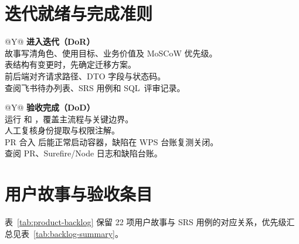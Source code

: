 \section{迭代就绪与完成准则}

\begin{table}[H]
\centering
\caption{迭代就绪与完成检查项}\label{tab:dor-dod}
\begin{minipage}[t]{.48\linewidth}
\reporttablesize
\begin{tabularx}{\linewidth}{@{}Y@{}}
\toprule
\textbf{进入迭代（DoR）} \\
\midrule
故事写清角色、使用目标、业务价值及 MoSCoW 优先级。 \\
表结构有变更时，先确定迁移方案。 \\
前后端对齐请求路径、DTO 字段与状态码。 \\
\midrule
查阅飞书待办列表、SRS 用例和 \mbox{SQL 评审记录。} \\
\bottomrule
\end{tabularx}
\end{minipage}\hfill
\begin{minipage}[t]{.48\linewidth}
\reporttablesize
\begin{tabularx}{\linewidth}{@{}Y@{}}
\toprule
\textbf{验收完成（DoD）} \\
\midrule
运行  和 ，覆盖主流程与\mbox{关键边界。} \\
人工复核身份提取与权限注解。 \\
PR 合入  后能正常启动容器，缺陷在 WPS 台账复测关闭。 \\
\midrule
查阅 PR、Surefire/Node 日志和缺陷台账。 \\
\bottomrule
\end{tabularx}
\end{minipage}
\end{table}

\section{用户故事与验收条目}

表~\ref{tab:product-backlog} 保留 22 项用户故事与 SRS 用例的对应关系，优先级汇总见表~\ref{tab:backlog-summary}。

